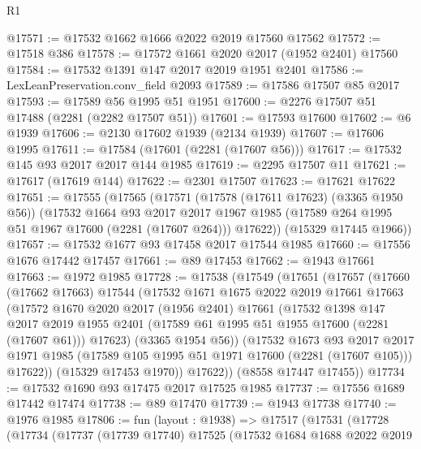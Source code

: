 \begin{lexlean}{R1}
\begin{coremodule}
@17571 := @17532 @1662 @1666 @2022 @2019 @17560 @17562
@17572 := @17518 @386
@17578 := @17572 @1661 @2020 @2017 (@1952 @2401) @17560
@17584 := @17532 @1391 @147 @2017 @2019 @1951 @2401
@17586 := LexLeanPreservation.conv_field @2093
@17589 := @17586 @17507 @85 @2017
@17593 := @17589 @56 @1995 @51 @1951
@17600 := @2276 @17507 @51 @17488 (@2281 (@2282 @17507 @51))
@17601 := @17593 @17600
@17602 := @6 @1939
@17606 := @2130 @17602 @1939 (@2134 @1939)
@17607 := @17606 @1995
@17611 := @17584 (@17601 (@2281 (@17607 @56)))
@17617 := @17532 @145 @93 @2017 @2017 @144 @1985
@17619 := @2295 @17507 @11
@17621 := @17617 (@17619 @144)
@17622 := @2301 @17507
@17623 := @17621 @17622
@17651 := @17555
    (@17565
      (@17571
        (@17578 (@17611 @17623) (@3365 @1950 @56))
        (@17532
          @1664
          @93
          @2017
          @2017
          @1967
          @1985
          (@17589 @264 @1995 @51 @1967 @17600 (@2281 (@17607 @264)))
          @17622))
      (@15329 @17445 @1966))
@17657 := @17532 @1677 @93 @17458 @2017 @17544 @1985
@17660 := @17556 @1676 @17442 @17457
@17661 := @89 @17453
@17662 := @1943 @17661
@17663 := @1972 @1985
@17728 := @17538
    (@17549
      (@17651
        (@17657
          (@17660
            (@17662 @17663)
            @17544
            (@17532
              @1671
              @1675
              @2022
              @2019
              @17661
              @17663
              (@17572
                @1670
                @2020
                @2017
                (@1956 @2401)
                @17661
                (@17532
                  @1398
                  @147
                  @2017
                  @2019
                  @1955
                  @2401
                  (@17589 @61 @1995 @51 @1955 @17600 (@2281 (@17607 @61)))
                  @17623)
                (@3365 @1954 @56))
              (@17532
                @1673
                @93
                @2017
                @2017
                @1971
                @1985
                (@17589 @105 @1995 @51 @1971 @17600 (@2281 (@17607 @105)))
                @17622))
            (@15329 @17453 @1970))
          @17622))
      (@8558 @17447 @17455))
@17734 := @17532 @1690 @93 @17475 @2017 @17525 @1985
@17737 := @17556 @1689 @17442 @17474
@17738 := @89 @17470
@17739 := @1943 @17738
@17740 := @1976 @1985
@17806 := fun (layout : @1938) =>
  @17517
    (@17531
      (@17728
        (@17734
          (@17737
            (@17739 @17740)
            @17525
            (@17532
              @1684
              @1688
              @2022
              @2019

\end{coremodule}
\end{lexlean}
